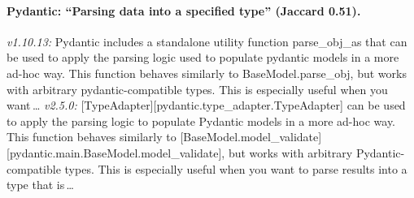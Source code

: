 \paragraph{Pydantic: ``Parsing data into a specified type'' (Jaccard 0.51).} \emph{v1.10.13:} Pydantic includes a standalone utility function parse\_obj\_as that can be used to apply the parsing logic used to populate pydantic models in a more ad-hoc way. This function behaves similarly to BaseModel.parse\_obj, but works with arbitrary pydantic-compatible types. This is especially useful when you want\,\dots{} \emph{v2.5.0:} [TypeAdapter][pydantic.type\_adapter.TypeAdapter] can be used to apply the parsing logic to populate Pydantic models in a more ad-hoc way. This function behaves similarly to [BaseModel.model\_validate][pydantic.main.BaseModel.model\_validate], but works with arbitrary Pydantic-compatible types. This is especially useful when you want to parse results into a type that is\,\dots
